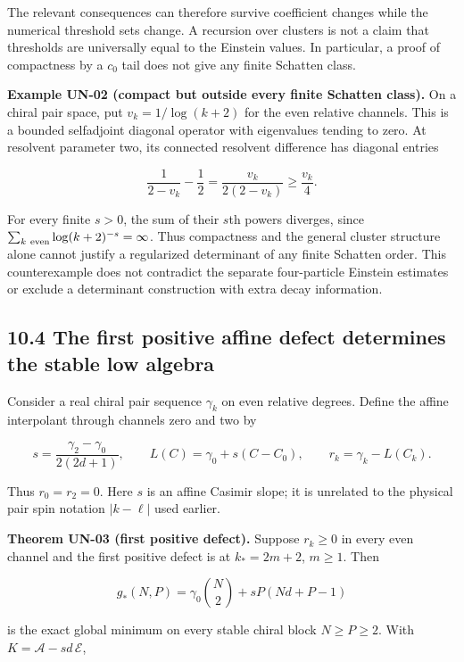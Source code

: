 The relevant consequences can therefore survive coefficient changes while the numerical threshold sets change. A recursion over clusters is not a claim that thresholds are universally equal to the Einstein values. In particular, a proof of compactness by a \(c_0\) tail does not give any finite Schatten class.

\textbf{Example UN-02 (compact but outside every finite Schatten class).} On a chiral pair space, put \(v_k=1/\log(k+2)\) for the even relative channels. This is a bounded selfadjoint diagonal operator with eigenvalues tending to zero. At resolvent parameter two, its connected resolvent difference has diagonal entries

\[
\frac{1}{2-v_k}-\frac12=\frac{v_k}{2(2-v_k)}
\geq\frac{v_k}{4}.
\]

For every finite \(s>0\), the sum of their \(s\)th powers diverges, since \(\sum_{k\ {\rm even}}\log(k+2)^{-s}=\infty\). Thus compactness and the general cluster structure alone cannot justify a regularized determinant of any finite Schatten order. This counterexample does not contradict the separate four-particle Einstein estimates or exclude a determinant construction with extra decay information.

\hypertarget{the-first-positive-affine-defect-determines-the-stable-low-algebra}{%
\subsection{10.4 The first positive affine defect determines the stable low algebra}\label{the-first-positive-affine-defect-determines-the-stable-low-algebra}}

Consider a real chiral pair sequence \(\gamma_k\) on even relative degrees. Define the affine interpolant through channels zero and two by

\[
s=\frac{\gamma_2-\gamma_0}{2(2d+1)},\qquad
L(C)=\gamma_0+s(C-C_0),\qquad
r_k=\gamma_k-L(C_k).
\]

Thus \(r_0=r_2=0\). Here \(s\) is an affine Casimir slope; it is unrelated to the physical pair spin notation \(|k-\ell|\) used earlier.

\textbf{Theorem UN-03 (first positive defect).} Suppose \(r_k\geq0\) in every even channel and the first positive defect is at \(k_*=2m+2\), \(m\geq1\). Then

\[
g_*(N,P)=\gamma_0\binom N2+sP(Nd+P-1)
\]

is the exact global minimum on every stable chiral block \(N\geq P\geq2\). With \(K=\mathscr A-sd\,\mathcal E\),

